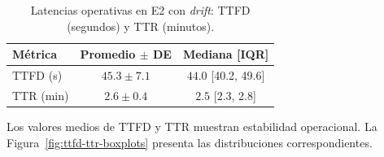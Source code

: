\begin{table}[htbp]
\centering
\caption{Latencias operativas en E2 con \textit{drift}: TTFD (segundos) y TTR (minutos).}
\label{tab:latencias}
\begin{tabular}{lcc}
\toprule
\textbf{Métrica} & \textbf{Promedio $\pm$ DE} & \textbf{Mediana [IQR]} \\
\midrule
TTFD (s)  & $45.3 \pm 7.1$   & $44.0$ [40.2, 49.6] \\
TTR (min) & $2.6 \pm 0.4$    & $2.5$ [2.3, 2.8] \\
\bottomrule
\end{tabular}
\end{table}

Los valores medios de TTFD y TTR muestran estabilidad operacional. 
La Figura~\ref{fig:ttfd-ttr-boxplots} presenta las distribuciones correspondientes.

